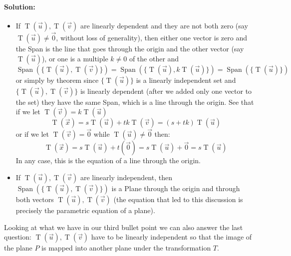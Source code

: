 \documentclass[12pt, letterpaper]{article}
\theoremstyle{statement}
\theoremstyle{statement}
\newenvironment{Solution}{\noindent\ignorespaces\paragraph{Solution:}}{\hfill \ding{122}\par\noindent}
\begin{document}
\begin{Solution}
\begin{itemize}
            \item If $\operatorname{T}(\Vec{u}), \operatorname{T}(\Vec{v})$ are linearly dependent and they are not both zero (say $\operatorname{T}(\Vec{u}) \neq \Vec{0}$, without loss of generality), then either one vector is zero and the Span is the line that goes through the origin and the other vector (say $\operatorname{T}(\Vec{u})$), or one is a multiple $k\neq0$ of the other and $\operatorname{Span}(\{ \operatorname{T}(\Vec{u}), \operatorname{T}(\Vec{v})\}) = 
            \operatorname{Span}(\{ \operatorname{T}(\Vec{u}), k\operatorname{T}(\Vec{u})\}) = 
            \operatorname{Span}(\{ \operatorname{T}(\Vec{u})\})$ or simply by theorem since $\{ \operatorname{T}(\Vec{u})\}$ is a linearly independent set and $\{ \operatorname{T}(\Vec{u}), \operatorname{T}(\Vec{v})\}$ is linearly dependent (after we added only one vector to the set) they have the same Span, which is a line through the origin. See that if we let $\operatorname{T}(\Vec{v})=k\operatorname{T}(\Vec{u})$ 
            $$\operatorname{T}(\Vec{x})=s\operatorname{T}(\Vec{u})+tk\operatorname{T}(\Vec{v}) = (s+tk)\operatorname{T}(\Vec{u})$$
            or if we let $\operatorname{T}(\Vec{v}) = \Vec{0}$ while $\operatorname{T}(\Vec{u})\neq \Vec{0}$ then:
            $$\operatorname{T}(\Vec{x})=s\operatorname{T}(\Vec{u})+t(\Vec{0})=s\operatorname{T}(\Vec{u})+\Vec{0}=s\operatorname{T}(\Vec{u})$$
            In any case, this is the equation of a line through the origin.
            \item If $\operatorname{T}(\Vec{u}), \operatorname{T}(\Vec{v})$ are linearly independent, then $\operatorname{Span}(\{ \operatorname{T}(\Vec{u}), \operatorname{T}(\Vec{v})\})$ is a Plane through the origin and through both vectors $\operatorname{T}(\Vec{u}), \operatorname{T}(\Vec{v})$ (the equation that led to this discussion is precisely the parametric equation of a plane).
        \end{itemize}
        
        Looking at what we have in our third bullet point we can also answer the last question: $\operatorname{T}(\Vec{u}), \operatorname{T}(\Vec{v})$ have to be linearly independent so that the image of the plane $P$ is mapped into another plane under the transformation $T$.
        
        \end{Solution}
    
\end{document}
